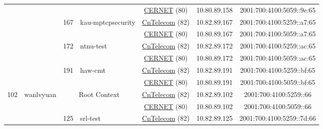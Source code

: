 \begin{small}
\begin{center}
\begin{longtable}{|c|c|c|c|c|c|c|c|}
  &  &  &  & \multicolumn{2}{|c|}{\tiny{\href{http://www.cernet.edu.cn}{CERNET} (80)}} & \tiny{10.80.89.158} & \tiny{2001:700:4100:5059::9e:65} \\* \cline{3-3}\cline{4-4}\cline{5-5}\cline{6-6}\cline{7-7}\cline{8-8}
  &  & \multirow{2}{*}{\tiny{167}} & \multicolumn{1}{|l|}{\multirow{2}{*}{\tiny{kau-mptcpsecurity}}} & \multicolumn{2}{|c|}{\tiny{\href{http://www.chinatelecom.com.cn}{CnTelecom} (82)}} & \tiny{10.82.89.167} & \tiny{2001:700:4100:5259::a7:65} \\* \cline{5-5}\cline{6-6}\cline{7-7}\cline{8-8}
  &  &  &  & \multicolumn{2}{|c|}{\tiny{\href{http://www.cernet.edu.cn}{CERNET} (80)}} & \tiny{10.80.89.167} & \tiny{2001:700:4100:5059::a7:65} \\* \cline{3-3}\cline{4-4}\cline{5-5}\cline{6-6}\cline{7-7}\cline{8-8}
  &  & \multirow{2}{*}{\tiny{172}} & \multicolumn{1}{|l|}{\multirow{2}{*}{\tiny{ntnu-test}}} & \multicolumn{2}{|c|}{\tiny{\href{http://www.chinatelecom.com.cn}{CnTelecom} (82)}} & \tiny{10.82.89.172} & \tiny{2001:700:4100:5259::ac:65} \\* \cline{5-5}\cline{6-6}\cline{7-7}\cline{8-8}
  &  &  &  & \multicolumn{2}{|c|}{\tiny{\href{http://www.cernet.edu.cn}{CERNET} (80)}} & \tiny{10.80.89.172} & \tiny{2001:700:4100:5059::ac:65} \\* \cline{3-3}\cline{4-4}\cline{5-5}\cline{6-6}\cline{7-7}\cline{8-8}
  &  & \multirow{2}{*}{\tiny{191}} & \multicolumn{1}{|l|}{\multirow{2}{*}{\tiny{haw-cmt}}} & \multicolumn{2}{|c|}{\tiny{\href{http://www.chinatelecom.com.cn}{CnTelecom} (82)}} & \tiny{10.82.89.191} & \tiny{2001:700:4100:5259::bf:65} \\* \cline{5-5}\cline{6-6}\cline{7-7}\cline{8-8}
  &  &  &  & \multicolumn{2}{|c|}{\tiny{\href{http://www.cernet.edu.cn}{CERNET} (80)}} & \tiny{10.80.89.191} & \tiny{2001:700:4100:5059::bf:65} \\ \hline
 \multirow{26}{*}{\tiny{102}} & \multicolumn{1}{|l|}{\multirow{26}{*}{\tiny{wanlvyuan}}} & \multicolumn{2}{|c|}{\multirow{2}{*}{\tiny{Root Context}}} & \multicolumn{2}{|c|}{\tiny{\href{http://www.chinatelecom.com.cn}{CnTelecom} (82)}} & \tiny{10.82.89.102} & \tiny{2001:700:4100:5259::66} \\* \cline{5-5}\cline{6-6}\cline{7-7}\cline{8-8}
  &  & \multicolumn{2}{|c|}{} & \multicolumn{2}{|c|}{\tiny{\href{http://www.cernet.edu.cn}{CERNET} (80)}} & \tiny{10.80.89.102} & \tiny{2001:700:4100:5059::66} \\* \cline{3-3}\cline{4-4}\cline{5-5}\cline{6-6}\cline{7-7}\cline{8-8}
  &  & \multirow{2}{*}{\tiny{125}} & \multicolumn{1}{|l|}{\multirow{2}{*}{\tiny{srl-test}}} & \multicolumn{2}{|c|}{\tiny{\href{http://www.chinatelecom.com.cn}{CnTelecom} (82)}} & \tiny{10.82.89.125} & \tiny{2001:700:4100:5259::7d:66} \\* \cline{5-5}\cline{6-6}\cline{7-7}\cline{8-8}

\end{longtable}
\end{center}
\end{small}
